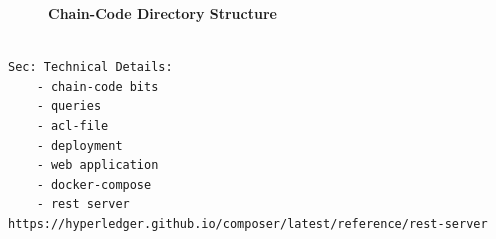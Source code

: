 \begin{figure}[htbp]
\centering
\begin{minipage}{5cm}
\end{minipage}
\caption{\bf\small Chain-Code Directory Structure}
\label{fig:chain-structure}
\end{figure}

\begin{verbatim}
    
Sec: Technical Details:
    - chain-code bits
    - queries
    - acl-file
    - deployment
    - web application
    - docker-compose
    - rest server https://hyperledger.github.io/composer/latest/reference/rest-server

\end{verbatim}

